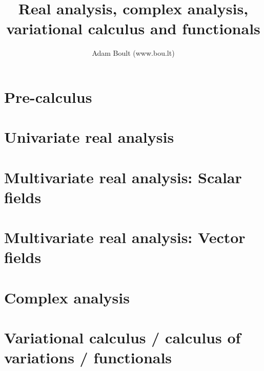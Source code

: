 \documentclass[oneside]{book}
\begin{document}
\author{Adam Boult (www.bou.lt)}
\title{Real analysis, complex analysis, variational calculus and functionals}
\maketitle

\setcounter{tocdepth}{0}
\tableofcontents



\part{Pre-calculus}






\part{Univariate real analysis}












\part{Multivariate real analysis: Scalar fields}




\part{Multivariate real analysis: Vector fields}





\part{Complex analysis}





\part{Variational calculus / calculus of variations / functionals}

\end{document}
